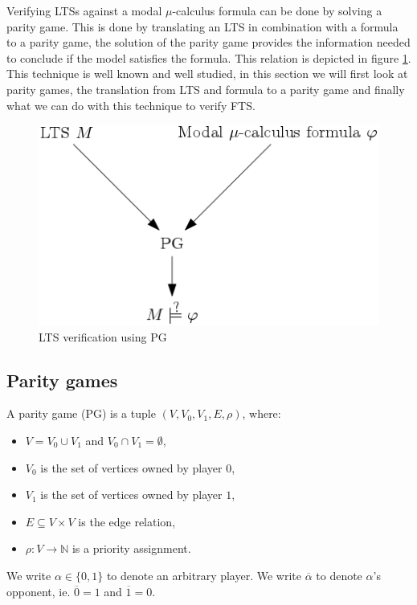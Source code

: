 Verifying LTSs against a modal $\mu$-calculus formula can be done by solving a parity game. This is done by translating an LTS in combination with a formula to a parity game, the solution of the parity game provides the information needed to conclude if the model satisfies the formula. This relation is depicted in figure \ref{fig:ltsverificationusingpg}. This technique is well known and well studied, in this section we will first look at parity games, the translation from LTS and formula to a parity game and finally what we can do with this technique to verify FTS.
\begin{figure}[h]
	\centering
	\includegraphics[scale=0.5]{Diagrams/LTSVerificationUsingPG}
	\caption[LTS verification using PG]{LTS verification using PG}
	\label{fig:ltsverificationusingpg}
\end{figure}


\subsection{Parity games}
\begin{definition}
	\label{def_PG}\cite{Bradfield2018}
	A parity game (PG) is a tuple $(V, V_0, V_1, E, \rho)$, where:
	\begin{itemize}
		\item $V = V_0 \cup V_1$ and $V_0 \cap V_1 = \emptyset$,
		\item $V_0$ is the set of vertices owned by player $0$,
		\item $V_1$ is the set of vertices owned by player $1$, 
		\item $E \subseteq V \times V$ is the edge relation,
		\item $\rho :  V \rightarrow \mathbb{N}$ is a priority assignment.
	\end{itemize}
\end{definition}
We write $\alpha \in \{0,1\}$ to denote an arbitrary player. We write $\overline{\alpha}$ to denote $\alpha$'s opponent, ie. $\overline{0} = 1$ and $\overline{1} = 0$.

